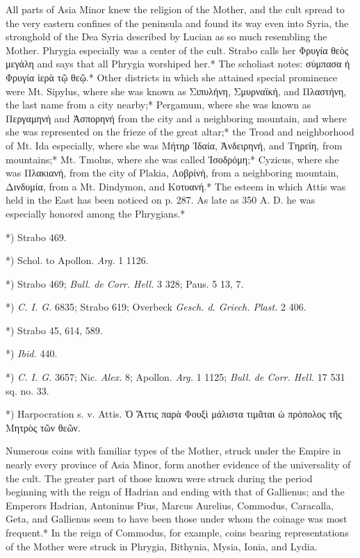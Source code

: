 \documentclass[a4paper, 11pt, oneside, polutonikogreek, english]{article}
\begin{document}
All parts of Asia Minor knew the religion of the Mother, and the cult spread to the very eastern confines of the peninsula and found its way even into Syria, the stronghold of the Dea Syria described by Lucian as so much resembling the Mother. Phrygia especially was a center of the cult. Strabo calls her Φρυγία θεὸς μεγάλη and says that all Phrygia worshiped her.* The scholiast notes: σύμπασα ἡ Φρυγία ἱερὰ τῷ θεῷ.* Other districts in which she attained special prominence were Mt. Sipylus, where she was known as Σιπυλήνη, Σμυρναϊκή, and Πλαστήνη, the last name from a city nearby;* Pergamum, where she was known as Περγαμηνή and Ἀσπορηνή from the city and a neighboring mountain, and where she was represented on the frieze of the great altar;* the Troad and neighborhood of Mt. Ida especially, where she was Μήτηρ Ἰδαία, Ἀνδειρηνή, and Τηρείη, from mountains;* Mt. Tmolus, where she was called Ἰσοδρόμη;* Cyzicus, where she was Πλακιανή, from the city of Plakia, Λοβρίνὴ, from a neighboring mountain, Δινδυμία, from a Mt. Dindymon, and Κοτυανή.* The esteem in which Attis was held in the East has been noticed on p. 287. As late as 350 A. D. he was especially honored among the Phrygians.*

*) Strabo 469.

*) Schol. to Apollon. \emph{Arg.} 1 1126.

*) Strabo 469; \emph{Bull. de Corr. Hell.} 3 328; Paus. 5 13, 7.

*) \emph{C. I. G.} 6835; Strabo 619; Overbeck \emph{Gesch. d. Griech. Plast.} 2 406.

*) Strabo 45, 614, 589.

*) \emph{Ibid.} 440.

*) \emph{C. I. G.} 3657; Nic. \emph{Alex.} 8; Apollon. \emph{Arg.} 1 1125; \emph{Bull. de Corr. Hell.} 17 531 sq. no. 33.

*) Harpocration s. v. Attis. Ὁ Ἄττις παρὰ Φουξὶ μάλιστα τιμᾶται ὡ πρόπολος τῆς Μητρὸς τῶν θεῶν.

Numerous coins with familiar types of the Mother, struck under the Empire in nearly every province of Asia Minor, form another evidence of the universality of the cult. The greater part of those known were struck during the period beginning with the reign of Hadrian and ending with that of Gallienus; and the Emperors Hadrian, Antoninus Pius, Marcus Aurelius, Commodus, Caracalla, Geta, and Gallienus seem to have been those under whom the coinage was most frequent.* In the reign of Commodus, for example, coins bearing representations of the Mother were struck in Phrygia, Bithynia, Mysia, Ionia, and Lydia.
\end{document}
